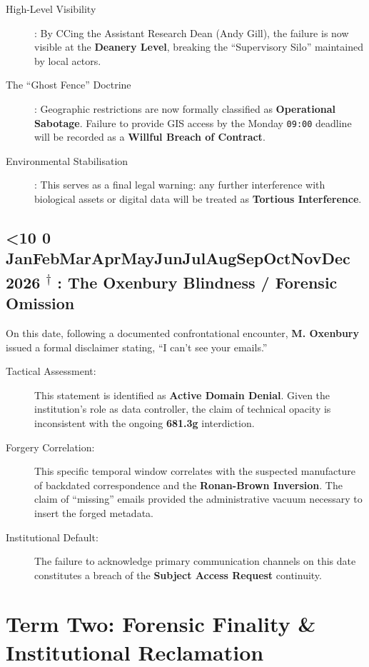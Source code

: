 \documentclass{EMBASSY}
\DeclareRobustCommand{\gmt}[3]{%
    \texorpdfstring{%
        {\color{DateGold}\textbf{%
            \ifnum#1<10 0\fi#1\,\textperiodcentered\,%
            \ifcase#2\or Jan\or Feb\or Mar\or Apr\or May\or Jun\or Jul\or Aug\or Sep\or Oct\or Nov\or Dec\fi
            \,\textperiodcentered\,20#3%
            \textsuperscript{$\dagger$}%
        }}%
    }{%
        (#1/#2/#3)%
    }%
}
\begin{document}
\begin{description}
	\item[High-Level Visibility]: By CCing the Assistant Research Dean (Andy Gill), the failure is now visible at the \textbf{Deanery Level}, breaking the ``Supervisory Silo'' maintained by local actors.
	\item[The ``Ghost Fence'' Doctrine]: Geographic restrictions are now formally classified as \textbf{Operational Sabotage}. Failure to provide GIS access by the Monday \texttt{09:00} deadline will be recorded as a \textbf{Willful Breach of Contract}.
	\item[Environmental Stabilisation]: This serves as a final legal warning: any further interference with biological assets or digital data will be treated as \textbf{Tortious Interference}.
\end{description}

\subsection{\gmt{26}{1}{26}: The Oxenbury Blindness / Forensic Omission}
On this date, following a documented confrontational encounter, \textbf{M. Oxenbury} issued a formal disclaimer stating, ``I can't see your emails.''

\begin{description}
	\item[Tactical Assessment:] This statement is identified as \textbf{Active Domain Denial}. Given the institution's role as data controller, the claim of technical opacity is inconsistent with the ongoing \textbf{681.3g} interdiction.
	\item[Forgery Correlation:] This specific temporal window correlates with the suspected manufacture of backdated correspondence and the \textbf{Ronan-Brown Inversion}. The claim of ``missing'' emails provided the administrative vacuum necessary to insert the forged metadata.
	\item[Institutional Default:] The failure to acknowledge primary communication channels on this date constitutes a breach of the \textbf{Subject Access Request} continuity.
\end{description}


\section{Term Two: Forensic Finality \& Institutional Reclamation}
\end{document}
